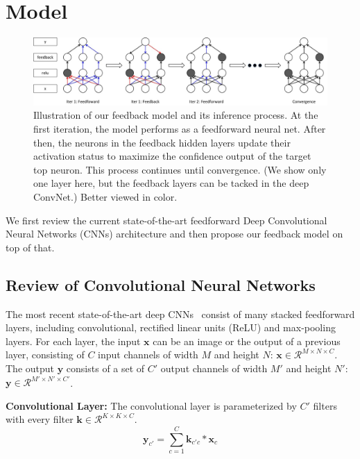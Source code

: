 \section{Model}
\label{sec:model}

\setlength{\tabcolsep}{2pt}
\begin{figure}
\begin{center}
\includegraphics[width=0.95\linewidth]{figs/model/model}
\caption{Illustration of our feedback model and its inference process. At the first iteration, the model performs as a feedforward neural net. After then, the neurons in the feedback hidden layers update their activation status to maximize the confidence output of the target top neuron. This process continues until convergence. (We show only one layer here, but the feedback layers can be tacked in the deep ConvNet.) Better viewed in color.}
\label{fig:model}
\end{center}
\end{figure}

We first review the current state-of-the-art feedforward Deep Convolutional Neural Networks (CNNs) architecture and then propose our feedback model on top of that. 

\subsection{Review of Convolutional Neural Networks}
The most recent state-of-the-art deep CNNs~\cite{Simonyan2014Very} consist of many stacked feedforward layers, including convolutional, rectified linear units (ReLU) and max-pooling layers. For each layer, the input $\mathbf{x}$ can be an image or the output of a previous layer, consisting of $C$ input channels of width $M$ and height $N$: $\mathbf{x} \in \mathcal{R}^{M \times N \times C}$. The output $\mathbf{y}$ consists of a set of $C'$ output channels of width $M'$ and height $N'$: $\mathbf{y} \in \mathcal{R}^{M' \times N' \times C'}$. 

\textbf{Convolutional Layer:} 
The convolutional layer is parameterized by $C'$ filters with every filter $\mathbf{k} \in \mathcal{R}^{K \times K \times C}$.
\begin{equation}
\mathbf{y}_{c'} = \sum_{c=1}^C \mathbf{k}_{c'c} * \mathbf{x}_c
\end{equation}

